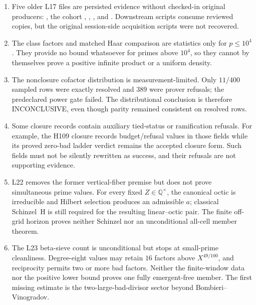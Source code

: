 \documentclass[11pt]{amsart}%
\newcommand{\Q}{\mathbb{Q}}
\begin{document}
\begin{enumerate}
\item Five older L17 files are persisted evidence without checked-in original
producers: , the cohort
, ,
, and
.  Downstream scripts consume reviewed
copies, but the original session-side acquisition scripts were not recovered.

\item The class factors and matched Haar comparison are statistics only for
\(p\le10^4\).  They provide no bound whatsoever for primes above \(10^4\), so
they cannot by themselves prove a positive infinite product or a uniform
density.

\item The nonclosure cofactor distribution is measurement-limited.  Only
\(11/400\) sampled rows were exactly resolved and \(389\) were prover
refusals; the predeclared power gate failed.  The distributional conclusion is
therefore INCONCLUSIVE, even though parity remained consistent on resolved
rows.

\item Some closure records contain auxiliary tied-status or ramification
refusals.  For example, the H109 closure records budget/refusal values in those
fields while its proved zero-bad ladder verdict remains the accepted closure
form.  Such fields must not be silently rewritten as success, and their
refusals are not supporting evidence.

\item L22 removes the former vertical-fiber premise but does not prove
simultaneous prime values.  For every fixed $Z\in\Q^\times$, the canonical
octic is irreducible and Hilbert selection produces an admissible $a$;
classical Schinzel~H is still required for the resulting linear--octic
pair.  The finite off-grid horizon proves neither Schinzel nor an
unconditional all-cell member theorem.

\item The L23 beta-sieve count is unconditional but stops at
small-prime cleanliness.  Degree-eight values may retain \(16\) factors
above \(X^{49/100}\), and reciprocity permits two or more bad factors.
Neither the finite-window data nor the positive lower bound proves one
fully emergent-free member.  The first missing estimate is the
two-large-bad-divisor sector beyond Bombieri--Vinogradov.


\end{enumerate}
\end{document}
